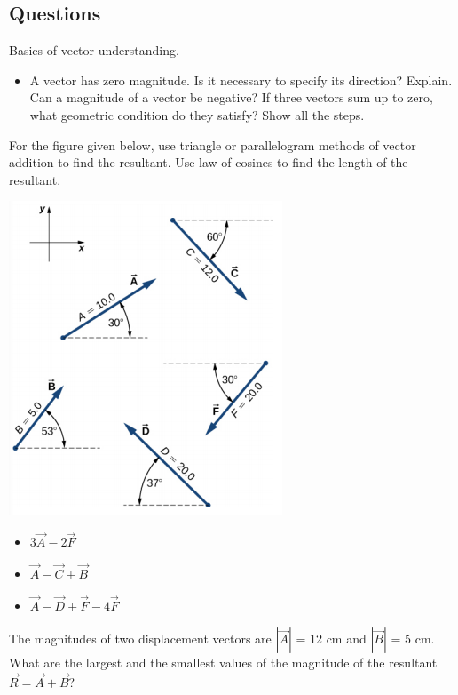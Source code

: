\documentclass[12pt,addpoints]{exam}
\begin{document}
\begin{questions}
\begin{center}
			\subsection*{Questions}	
		\end{center}
		\question Basics of vector understanding.
		\begin{itemize}
			\item A vector has zero magnitude. Is it necessary to specify its direction? Explain. \vspace{1cm}
			\question Can a magnitude of a vector be negative?\vspace{1cm}
			\question If three vectors sum up to zero, what geometric condition do they satisfy? Show all the steps. \vspace{1.5in}
		\end{itemize}
		\question For the figure given below, use triangle or parallelogram methods of vector addition to find the resultant. Use law of cosines to find the length of the resultant.
		\begin{center}
			\includegraphics[scale=0.6]{vectors.png}
		\end{center}
		\begin{itemize}
			\item $3\vec{A} - 2 \vec{F}$ \vspace{1.5in}
			\item $\vec{A} -  \vec{C} + \vec{B}$ \vspace{1.5in}
			\item $\vec{A} -  \vec{D} + \vec{F}-4\vec{F}$ \vspace{1.5in}
		\end{itemize}
		\question The magnitudes of two displacement vectors are $|\vec{A}|$ = 12 cm and $|\vec{B}|$ = 5 cm. What are the largest and the smallest values of the magnitude of the resultant  $\vec{R}=\vec{A}+\vec{B}$? \vspace{2cm}

\end{questions}
\end{document}
